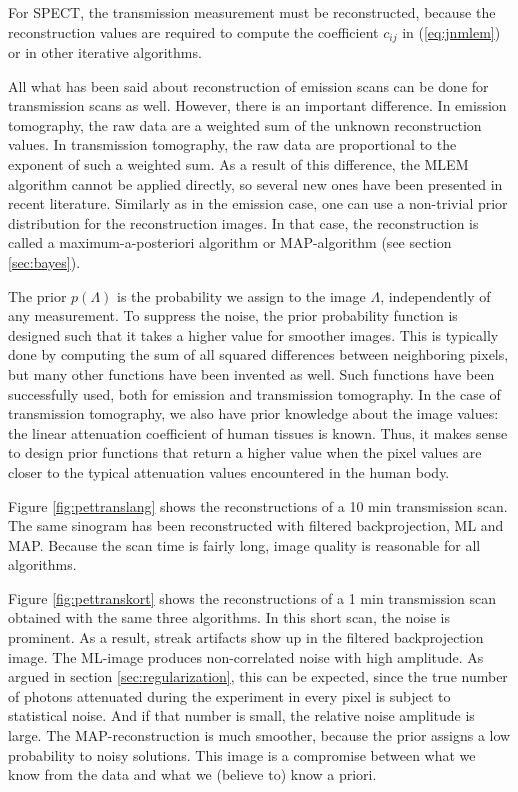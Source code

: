 \documentclass[11pt,oneside]{article}
\begin{document}
For SPECT, the transmission measurement must be reconstructed, because the
reconstruction values are required to compute the coefficient $c_{ij}$ in
(\ref{eq:jnmlem}) or in other iterative algorithms.

All what has been said about reconstruction of emission scans can be done for
transmission scans as well. However, there is an important difference. In
emission tomography, the raw data are a weighted sum of the unknown
reconstruction values. In transmission tomography, the raw data are
proportional to the exponent of such a weighted sum. As a result of this
difference, the MLEM algorithm cannot be applied directly, so several new
ones have been presented in recent literature. Similarly as in the emission
case, one can use a non-trivial prior distribution for the reconstruction
images. In that case, the reconstruction is called a maximum-a-posteriori
algorithm or MAP-algorithm (see section \ref{sec:bayes}).

The prior $p(\Lambda)$ is the probability we assign to the image $\Lambda$,
independently of any measurement. To suppress the noise, the prior probability
function is designed such that it takes a higher value for smoother images.
This is typically done by computing the sum of all squared differences between
neighboring pixels, but many other functions have been invented as well.
Such functions have been successfully used, both for emission and transmission
tomography. In the case of transmission tomography, we also have prior knowledge
about the image values: the linear attenuation coefficient of human tissues is
known. Thus, it makes sense to design prior functions that return a higher value
when the pixel values are closer to the typical attenuation values encountered
in the human body.

Figure \ref{fig:pettranslang} shows the reconstructions of a 10 min
transmission scan. The same sinogram has been reconstructed with filtered
backprojection, ML and MAP. Because the scan time is fairly long, image
quality is reasonable for all algorithms.

Figure \ref{fig:pettranskort} shows the reconstructions of a 1 min
transmission scan obtained with the same three algorithms. In this short scan,
the noise is prominent. As a result, streak artifacts show up in the filtered
backprojection image. The ML-image produces non-correlated noise with high
amplitude. As argued in section \ref{sec:regularization}, this can be expected,
since the true number of photons attenuated during the experiment in every
pixel is subject to statistical noise. And if that number is small, the
relative noise amplitude is large. The MAP-reconstruction is much smoother,
because the prior assigns a low probability to noisy solutions. This image is
a compromise between what we know from the data and what we (believe to) know
a priori.
\end{document}
